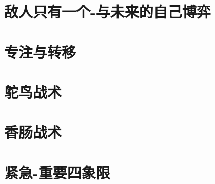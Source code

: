 \documentclass[]{book}
\begin{document}
\section{敌人只有一个-与未来的自己博弈}\label{-}

\section{专注与转移}

\section{鸵鸟战术}

\section{香肠战术}

\section{紧急-重要四象限}\label{-}


\end{document}
